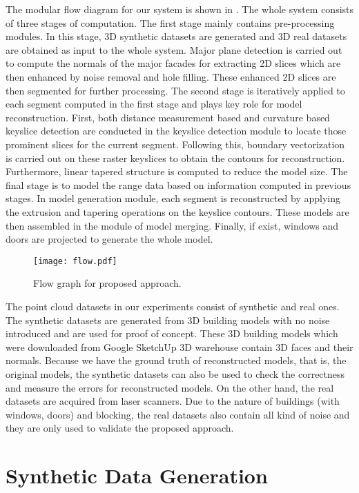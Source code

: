 The modular flow diagram for our system is shown in .
The whole system consists of three stages of computation.
The first stage mainly contains pre-processing modules.
In this stage, 3D synthetic datasets are generated and
3D real datasets are obtained as input to the whole system.
Major plane detection is carried out to compute the normals of the major facades
for extracting 2D slices which are then enhanced by noise removal and
hole filling.
These enhanced 2D slices are then segmented for further processing.
The second stage is iteratively applied to each segment computed in
the first stage and plays key role for model reconstruction.
First, both distance measurement based and curvature based keyslice
detection are conducted in the keyslice detection module
to locate those prominent slices for the current segment.
Following this, boundary vectorization is carried out on these raster keyslices
to obtain the contours for reconstruction.
Furthermore, linear tapered structure is computed to reduce the model size.
The final stage is to model the range data
based on information computed in previous stages.
In model generation module, each segment is reconstructed by applying the extrusion
and tapering operations on the keyslice contours.
These models are then assembled in the module of model merging.
Finally, if exist, windows and doors are projected to generate the whole model.

\begin{figure}[htbp]
  \centering
  \texttt{[image: flow.pdf]}
      \caption{Flow graph for proposed approach.}
      \label{fig:flow}
\end{figure}

The point cloud datasets in our experiments consist of synthetic and real ones.
The synthetic datasets are generated from 3D building models
with no noise introduced
and are used for proof of concept.
These 3D building models which were downloaded from Google SketchUp 3D warehouse
contain 3D faces and their normals.
Because we have the ground truth of reconstructed models,
that is, the original models,
the synthetic datasets can also be used to check the correctness and
measure the errors for reconstructed models.
On the other hand, the real datasets are acquired from laser scanners.
Due to the nature of buildings (with windows, doors) and blocking, the real
datasets also contain all kind of noise
and they are only used to validate the proposed approach.

\section{Synthetic Data Generation}

